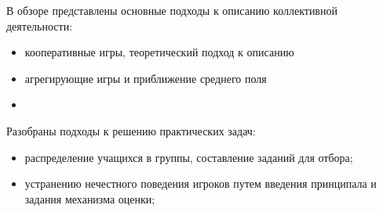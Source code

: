 В обзоре представлены основные подходы к описанию коллективной деятельности:\begin{itemize}
    \item кооперативные игры, теоретический подход к описанию \cite{roth1988shapley}
    \item агрегирующие игры и приближение среднего поля \cite{}
    \item  
\end{itemize}

Разобраны подходы к решению практических задач: \begin{itemize}
    \item распределение учащихся в группы, составление заданий для отбора;
    \item устранению нечестного поведения игроков путем 
    введения принципала и задания механизма оценки;
\end{itemize}
